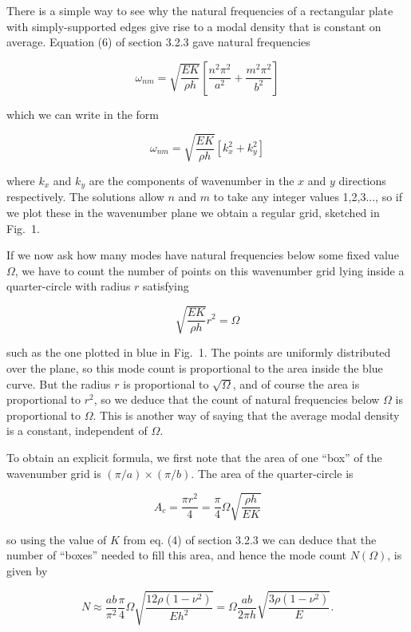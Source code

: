   There is a simple way to see why the natural frequencies of a rectangular 
  plate with simply-supported edges give rise to a modal density that is 
  constant on average. Equation (6) of section 3.2.3 gave natural frequencies 

  $$\omega_{nm} = \sqrt{\frac{EK}{\rho h}} \left[\frac{n^2 
  \pi^2}{a^2}+\frac{m^2 \pi^2}{b^2} \right] \tag{1}$$ 

  which we can write in the form 

  $$\omega_{nm} = \sqrt{\frac{EK}{\rho h}} \left[k_x^2+k_y^2 \right] \tag{2}$$ 

  where $k_x$ and $k_y$ are the components of wavenumber in the $x$ and $y$ 
  directions respectively. The solutions allow $n$ and $m$ to take any integer 
  values 1,2,3..., so if we plot these in the wavenumber plane we obtain a 
  regular grid, sketched in Fig.\ 1. 

  If we now ask how many modes have natural frequencies below some fixed value 
  $\Omega$, we have to count the number of points on this wavenumber grid lying 
  inside a quarter-circle with radius $r$ satisfying 

  $$\sqrt{\frac{EK}{\rho h}} r^2 = \Omega \tag{3}$$ 

  such as the one plotted in blue in Fig.\ 1. The points are uniformly 
  distributed over the plane, so this mode count is proportional to the area 
  inside the blue curve. But the radius $r$ is proportional to $\sqrt{\Omega}$, 
  and of course the area is proportional to $r^2$, so we deduce that the count 
  of natural frequencies below $\Omega$ is proportional to $\Omega$. This is 
  another way of saying that the average modal density is a constant, 
  independent of $\Omega$. 

  To obtain an explicit formula, we first note that the area of one ``box'' of 
  the wavenumber grid is $(\pi/a) \times (\pi/b)$. The area of the 
  quarter-circle is 

  $$A_c = \dfrac{\pi r^2}{4} = \dfrac{\pi}{4} \Omega \sqrt{\dfrac{\rho h}{EK}} 
  \tag{4}$$ 

  so using the value of $K$ from eq. (4) of section 3.2.3 we can deduce that 
  the number of ``boxes'' needed to fill this area, and hence the mode count 
  $N(\Omega)$, is given by 

  $$N \approx \dfrac{ab}{\pi^2} \dfrac{\pi}{4} \Omega \sqrt{\dfrac{12 \rho 
  (1-\nu^2)}{Eh^2}} = \Omega \dfrac{ab}{2 \pi h} \sqrt{\dfrac{3 \rho 
  (1-\nu^2)}{E}} . \tag{5}$$ 

